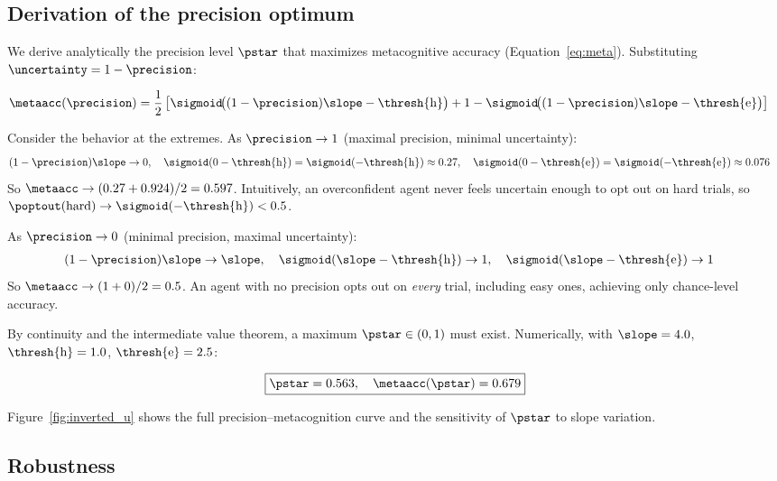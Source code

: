 \subsection*{Derivation of the precision optimum}
\label{sec:analytical:deriv}

We derive analytically the precision level $\pstar$ that maximizes metacognitive accuracy
(Equation~\ref{eq:meta}). Substituting $\uncertainty = 1 - \precision$:

\begin{align}
  \metaacc(\precision) &= \frac{1}{2}\left[
    \sigmoid\!\bigl((1-\precision)\slope - \thresh{\text{h}}\bigr) +
    1 - \sigmoid\!\bigl((1-\precision)\slope - \thresh{\text{e}}\bigr)
  \right]
\end{align}

Consider the behavior at the extremes. As $\precision \to 1$ (maximal precision, minimal uncertainty):
\begin{align}
  (1-\precision)\slope \to 0, \quad
  \sigmoid(0 - \thresh{\text{h}}) &= \sigmoid(-\thresh{\text{h}}) \approx 0.27, \quad
  \sigmoid(0 - \thresh{\text{e}}) = \sigmoid(-\thresh{\text{e}}) \approx 0.076
\end{align}
So $\metaacc \to (0.27 + 0.924)/2 = 0.597$. Intuitively, an overconfident agent
never feels uncertain enough to opt out on hard trials, so $\poptout(\text{hard}) \to
\sigmoid(-\thresh{\text{h}}) < 0.5$.

As $\precision \to 0$ (minimal precision, maximal uncertainty):
\begin{align}
  (1-\precision)\slope \to \slope, \quad
  \sigmoid(\slope - \thresh{\text{h}}) &\to 1, \quad
  \sigmoid(\slope - \thresh{\text{e}}) \to 1
\end{align}
So $\metaacc \to (1 + 0)/2 = 0.5$. An agent with no precision opts out on
\emph{every} trial, including easy ones, achieving only chance-level accuracy.

By continuity and the intermediate value theorem, a maximum $\pstar \in (0,1)$ must exist.
Numerically, with $\slope = 4.0$, $\thresh{\text{h}} = 1.0$, $\thresh{\text{e}} = 2.5$:

\begin{equation}
  \boxed{\pstar = 0.563, \quad \metaacc(\pstar) = 0.679}
\end{equation}

Figure~\ref{fig:inverted_u} shows the full precision--metacognition curve and the sensitivity of
$\pstar$ to slope variation.

\subsection*{Robustness}
\label{sec:analytical:robust}

